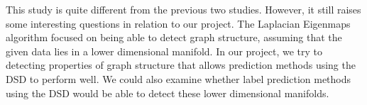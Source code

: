 This study is quite different from the previous two studies. However, it still raises some interesting questions in relation to our project.
The Laplacian Eigenmaps algorithm focused on being able to detect graph structure, assuming that
the given data lies in a lower dimensional manifold. In our project, we try 
to detecting properties of graph structure that allows prediction methods
using the DSD to perform well. We could also examine whether label prediction
methods using the DSD would be able to detect these lower dimensional manifolds.


